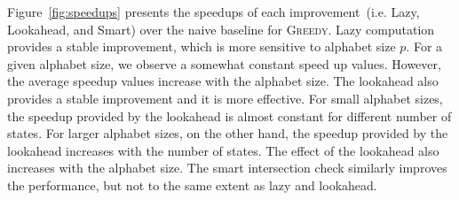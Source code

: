 \documentclass[12pt]{article}
\newcommand{\greedyAlgo}{\textsc{Greedy}}
\begin{document}
Figure~\ref{fig:speedups} presents the speedups of each improvement~(i.e. Lazy,  Lookahead, and Smart) over the naive baseline for \greedyAlgo . Lazy computation provides a stable improvement, which is more sensitive to alphabet size $p$. For a given alphabet size, we observe a somewhat constant speed up values. However, the average speedup values increase with the alphabet size. The lookahead also provides a stable improvement and it is more effective. For small alphabet sizes, the speedup provided by the lookahead is almost constant for different number of states. For larger alphabet sizes, on the other hand, the speedup provided by the lookahead increases with the number of states. The effect of the lookahead also increases with the alphabet size. The smart intersection check similarly improves the performance, but not to the same extent as lazy and lookahead.
\end{document}
